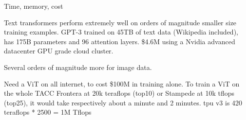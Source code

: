 Time, memory, cost

Text transformers perform extremely well on orders of magnitude smaller size training examples.
GPT-3 trained on 45TB of text data (Wikipedia included), has 175B parameters and 96 attention layers. \citep{GPT3}
\$4.6M using a Nvidia advanced datacenter GPU grade cloud cluster.

Several orders of magnitude more for image data.

Need a ViT on all internet, to cost \$100M in training alone. 
To train a ViT on the whole TACC Frontera at 20k teraflops (top10) or 
Stampede at 10k tflops (top25), it would take respectively about a minute and 2 minutes.
tpu v3 is 420 teraflops * 2500 = 1M Tflops









